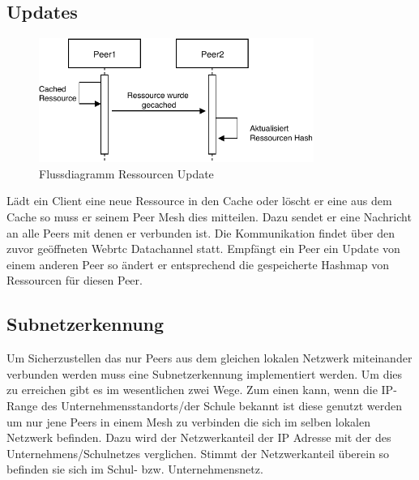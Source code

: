 \subsection{ Updates }
\begin{figure}[!h]
	\centering
	\includegraphics[width=0.8\textwidth]{figures/Ressourcen_update}
	\caption[A Figure Short-Title]{Flussdiagramm Ressourcen Update}
	\label{fig:update_resource}
\end{figure}

Lädt ein Client eine neue Ressource in den Cache oder löscht er eine aus dem Cache so muss er seinem Peer Mesh dies mitteilen. Dazu sendet er eine Nachricht an alle Peers mit denen er verbunden ist. Die Kommunikation findet über den zuvor geöffneten Webrtc Datachannel statt. Empfängt ein Peer ein Update von einem anderen Peer so ändert er entsprechend die gespeicherte Hashmap von Ressourcen für diesen Peer.

%
\subsection{Subnetzerkennung}

Um Sicherzustellen das nur Peers aus dem gleichen lokalen Netzwerk miteinander verbunden werden muss eine Subnetzerkennung implementiert werden.
Um dies zu erreichen gibt es im wesentlichen zwei Wege. Zum einen kann, wenn die IP-Range des Unternehmensstandorts/der Schule bekannt ist diese genutzt werden um nur jene Peers in einem Mesh zu verbinden die sich im selben lokalen Netzwerk befinden. Dazu wird der Netzwerkanteil der IP Adresse mit der des Unternehmens/Schulnetzes verglichen. Stimmt der Netzwerkanteil überein so befinden sie sich im Schul- bzw. Unternehmensnetz. 

